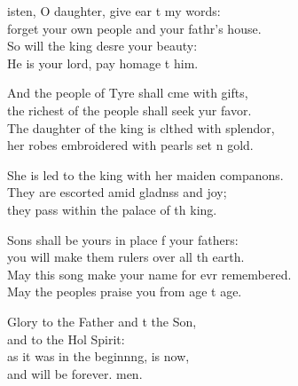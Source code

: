 \settowidth{\versewidth}{The daughter of the king is clothed with splendor, *}
\begin{psalmverse}%
  \begin{patverse}
isten, O daughter, give ear t my words:\Med\\
forget your own people and your fathr’s house.\\
So will the king des\pointup{\i}re your beauty:\Med\\
He is your lord, pay homage t him.

And the people of Tyre shall cme with gifts,\Med\\
the richest of the people shall seek yur favor.\\
The daughter of the king is clthed with splendor,\Med\\
her robes embroidered with pearls set \pointup{\i}n gold.

She is led to the king with her maiden compan\pointup{\i}ons.\Flex\\
They are escorted amid gladnss and joy;\Med\\
they pass within the palace of th king.

Sons shall be yours in place f your fathers:\Med\\
you will make them rulers over all th earth.\\
May this song make your name for evr remembered.\Med\\
May the peoples praise you from age t age.

Glory to the Father and t the Son,\Med\\
and to the Hol Spirit:\\
as it was in the beginn\pointup{\i}ng, is now,\Med\\
and will be forever. men. 
  \end{patverse}
\end{psalmverse}
